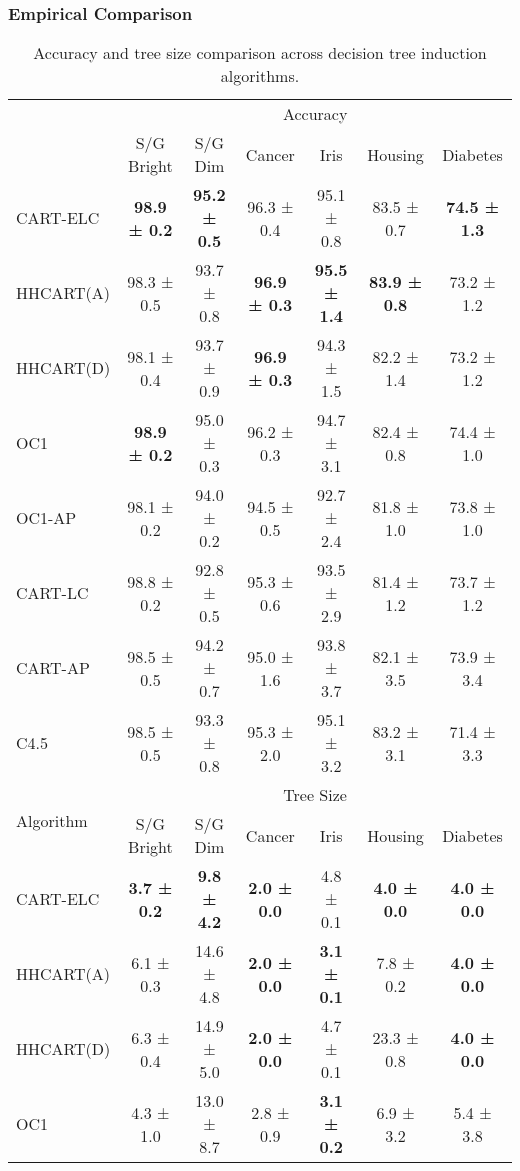 \documentclass[10pt]{beamer}
\begin{document}
\begin{frame}
	\frametitle{Empirical Comparison}
	\tiny

\begin{table}[h]
	\centering
    \caption{Accuracy and tree size comparison across decision tree induction algorithms.}
	\begin{tabular}{lcccccc} 
		\addlinespace
		\toprule
		\multirow{2}{*}{Algorithm} & \multicolumn{6}{c}{Accuracy}  \\ 
		\cmidrule(lr){2-7}  
		& S/G Bright & S/G Dim & Cancer & Iris & Housing & Diabetes \\ 
		\midrule
		CART-ELC  & \textbf{98.9 ± 0.2} & \textbf{95.2 ± 0.5} & 96.3 ± 0.4 & 95.1 ± 0.8 & 83.5 ± 0.7 & \textbf{74.5 ± 1.3}  \\

		HHCART(A) & 98.3 ± 0.5 & 93.7 ± 0.8 & \textbf{96.9 ± 0.3} &  \textbf{95.5 ± 1.4} &  \textbf{83.9 ± 0.8} & 73.2 ± 1.2  \\
		HHCART(D) & 98.1 ± 0.4 & 93.7 ± 0.9 & \textbf{96.9 ± 0.3} &  94.3 ± 1.5 &  82.2 ± 1.4 & 73.2 ± 1.2  \\
		OC1       & \textbf{98.9 ± 0.2} & 95.0 ± 0.3 & 96.2 ± 0.3 & 94.7 ± 3.1 & 82.4 ± 0.8 & 74.4 ± 1.0  \\
		OC1-AP    & 98.1 ± 0.2 & 94.0 ± 0.2 & 94.5 ± 0.5 & 92.7 ± 2.4 & 81.8 ± 1.0 & 73.8 ± 1.0  \\
		CART-LC   & 98.8 ± 0.2 & 92.8 ± 0.5 & 95.3 ± 0.6 & 93.5 ± 2.9 & 81.4 ± 1.2 & 73.7 ± 1.2  \\
		CART-AP   & 98.5 ± 0.5 & 94.2 ± 0.7 & 95.0 ± 1.6 & 93.8 ± 3.7 & 82.1 ± 3.5 & 73.9 ± 3.4  \\
		C4.5      & 98.5 ± 0.5 & 93.3 ± 0.8 & 95.3 ± 2.0 & 95.1 ± 3.2 & 83.2 ± 3.1 & 71.4 ± 3.3  \\ 
		\midrule
		\multirow{2}{*}{Algorithm} & \multicolumn{6}{c}{Tree Size}  \\ 
		\cmidrule(lr){2-7}  
		& S/G Bright & S/G Dim & Cancer & Iris & Housing & Diabetes \\ 
		\midrule
		CART-ELC  & \textbf{3.7 ± 0.2}  & \textbf{9.8 ± 4.2}  & \textbf{2.0 ± 0.0}  & 4.8 ± 0.1  & \textbf{4.0 ± 0.0}  & \textbf{4.0 ± 0.0}  \\
		HHCART(A) & 6.1 ± 0.3  & 14.6 ± 4.8  & \textbf{2.0 ± 0.0}  & \textbf{3.1 ± 0.1}  & 7.8 ± 0.2  & \textbf{4.0 ± 0.0}  \\
		HHCART(D) & 6.3 ± 0.4  & 14.9 ± 5.0  & \textbf{2.0 ± 0.0}  & 4.7 ± 0.1  & 23.3 ± 0.8  & \textbf{4.0 ± 0.0}  \\
		OC1       & 4.3 ± 1.0  & 13.0 ± 8.7  & 2.8 ± 0.9  & \textbf{3.1 ± 0.2}  & 6.9 ± 3.2  & 5.4 ± 3.8  \\

\end{tabular}
\end{table}
\end{frame}
\end{document}
